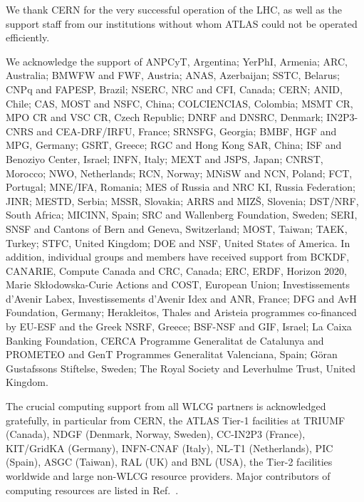 

We thank CERN for the very successful operation of the LHC, as well as the
support staff from our institutions without whom ATLAS could not be
operated efficiently.

We acknowledge the support of ANPCyT, Argentina; YerPhI, Armenia; ARC, Australia; BMWFW and FWF, Austria; ANAS, Azerbaijan; SSTC, Belarus; CNPq and FAPESP, Brazil; NSERC, NRC and CFI, Canada; CERN; ANID, Chile; CAS, MOST and NSFC, China; COLCIENCIAS, Colombia; MSMT CR, MPO CR and VSC CR, Czech Republic; DNRF and DNSRC, Denmark; IN2P3-CNRS and CEA-DRF/IRFU, France; SRNSFG, Georgia; BMBF, HGF and MPG, Germany; GSRT, Greece; RGC and Hong Kong SAR, China; ISF and Benoziyo Center, Israel; INFN, Italy; MEXT and JSPS, Japan; CNRST, Morocco; NWO, Netherlands; RCN, Norway; MNiSW and NCN, Poland; FCT, Portugal; MNE/IFA, Romania; MES of Russia and NRC KI, Russia Federation; JINR; MESTD, Serbia; MSSR, Slovakia; ARRS and MIZ\v{S}, Slovenia; DST/NRF, South Africa; MICINN, Spain; SRC and Wallenberg Foundation, Sweden; SERI, SNSF and Cantons of Bern and Geneva, Switzerland; MOST, Taiwan; TAEK, Turkey; STFC, United Kingdom; DOE and NSF, United States of America. In addition, individual groups and members have received support from BCKDF, CANARIE, Compute Canada and CRC, Canada; ERC, ERDF, Horizon 2020, Marie Sk{\l}odowska-Curie Actions and COST, European Union; Investissements d'Avenir Labex, Investissements d'Avenir Idex and ANR, France; DFG and AvH Foundation, Germany; Herakleitos, Thales and Aristeia programmes co-financed by EU-ESF and the Greek NSRF, Greece; BSF-NSF and GIF, Israel; La Caixa Banking Foundation, CERCA Programme Generalitat de Catalunya and PROMETEO and GenT Programmes Generalitat Valenciana, Spain; G\"{o}ran Gustafssons Stiftelse, Sweden; The Royal Society and Leverhulme Trust, United Kingdom.

The crucial computing support from all WLCG partners is acknowledged gratefully, in particular from CERN, the ATLAS Tier-1 facilities at TRIUMF (Canada), NDGF (Denmark, Norway, Sweden), CC-IN2P3 (France), KIT/GridKA (Germany), INFN-CNAF (Italy), NL-T1 (Netherlands), PIC (Spain), ASGC (Taiwan), RAL (UK) and BNL (USA), the Tier-2 facilities worldwide and large non-WLCG resource providers. Major contributors of computing resources are listed in Ref.~\cite{ATL-SOFT-PUB-2020-001}.

